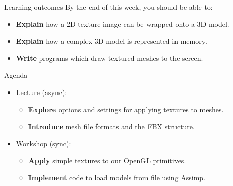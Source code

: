 \begin{frame}{Learning outcomes}
	By the end of this week, you should be able to:
	\begin{itemize}
		\item \textbf{Explain} how a 2D texture image can be wrapped onto a 3D model.
		\item \textbf{Explain} how a complex 3D model is represented in memory.
		\item \textbf{Write} programs which draw textured meshes to the screen.
	\end{itemize}
\end{frame}

\begin{frame}{Agenda}
	\begin{itemize}
		\pause\item Lecture (async):
		\begin{itemize}
			\item \textbf{Explore} options and settings for applying textures to meshes.
			\item \textbf{Introduce} mesh file formats and the FBX structure.
		\end{itemize}
		\pause\item Workshop (sync):
		\begin{itemize}
			\item \textbf{Apply} simple textures to our OpenGL primitives.
			\item \textbf{Implement} code to load models from file using Assimp.
		\end{itemize}
	\end{itemize}
\end{frame}